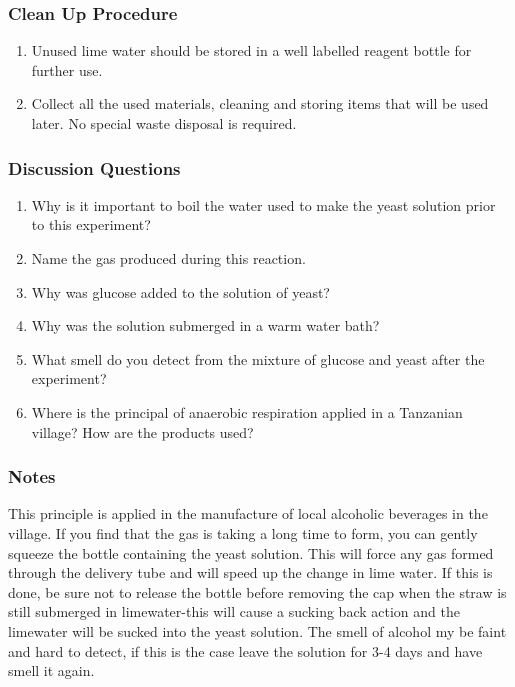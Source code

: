\subsubsection*{Clean Up Procedure}
\begin{enumerate}
\item{Unused lime water should be stored in a well labelled reagent bottle for further use.}
\item{Collect all the used materials, cleaning and storing items that will be used later. No special waste disposal is required.}
\end{enumerate}

\subsubsection*{Discussion Questions}
\begin{enumerate}
\item{Why is it important to boil the water used to make the yeast solution prior to this experiment?}
\item{Name the gas produced during this reaction.}
\item{Why was glucose added to the solution of yeast?}
\item{Why was the solution submerged in a warm water bath?}
\item{What smell do you detect from the mixture of glucose and yeast after the experiment?}
\item{Where is the principal of anaerobic respiration applied in a Tanzanian village? How are the products used?}
\end{enumerate}

\subsubsection*{Notes}
This principle is applied in the manufacture of local alcoholic beverages in the village.
If you find that the gas is taking a long time to form, you can gently squeeze the bottle containing the yeast solution. This will force any gas formed through the delivery tube and will speed up the change in lime water. If this is done, be sure not to release the bottle before removing the cap when the straw is still submerged in limewater-this will cause a sucking back action and the limewater will be sucked into the yeast solution.
The smell of alcohol my be faint and hard to detect, if this is the case leave the solution for 3-4 days and have  smell it again.
